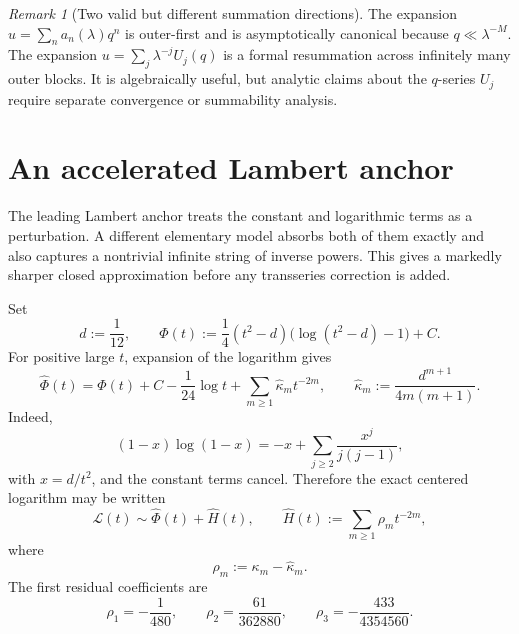 \documentclass[11pt,oneside]{article}
\theoremstyle{plain}
\theoremstyle{definition}
\theoremstyle{remark}
\newtheorem{remark}[theorem]{Remark}
\newcommand{\Lcal}{\mathcal{L}}
\begin{document}
\begin{remark}[Two valid but different summation directions]
The expansion \(u=\sum_n a_n(\lambda)q^n\) is outer-first and is asymptotically
canonical because \(q\ll\lambda^{-M}\).  The expansion
\(u=\sum_j\lambda^{-j}U_j(q)\) is a formal resummation across infinitely many
outer blocks.  It is algebraically useful, but analytic claims about the
\(q\)-series \(U_j\) require separate convergence or summability analysis.
\end{remark}

\section{An accelerated Lambert anchor}
\label{sec:accelerated-anchor}

The leading Lambert anchor treats the constant and logarithmic terms as a
perturbation.  A different elementary model absorbs both of them exactly and
also captures a nontrivial infinite string of inverse powers.  This gives a
markedly sharper closed approximation before any transseries correction is
added.

Set
\begin{equation}
 d:=\frac1{12},
 \qquad
 \widehat\Phi(t)
 :=\frac14(t^2-d)\bigl(\log(t^2-d)-1\bigr)+C.
 \label{eq:Phihat-def}
\end{equation}
For positive large \(t\), expansion of the logarithm gives
\begin{equation}
 \widehat\Phi(t)
 =\Phi(t)+C-\frac1{24}\log t
  +\sum_{m\ge1}\widehat\kappa_m t^{-2m},
 \qquad
 \widehat\kappa_m:=\frac{d^{m+1}}{4m(m+1)}.
 \label{eq:Phihat-expansion}
\end{equation}
Indeed,
\begin{equation}
 (1-x)\log(1-x)
 =-x+\sum_{j\ge2}\frac{x^j}{j(j-1)},
 \label{eq:one-minus-x-log}
\end{equation}
with \(x=d/t^2\), and the constant terms cancel.  Therefore the exact
centered logarithm may be written
\begin{equation}
 \Lcal(t)
 \sim \widehat\Phi(t)+\widehat H(t),
 \qquad
 \widehat H(t):=\sum_{m\ge1}\rho_m t^{-2m},
 \label{eq:accelerated-splitting}
\end{equation}
where
\begin{equation}
 \rho_m:=\kappa_m-\widehat\kappa_m.
 \label{eq:rho-def}
\end{equation}
The first residual coefficients are
\begin{equation}
 \rho_1=-\frac1{480},
 \qquad
 \rho_2=\frac{61}{362880},
 \qquad
 \rho_3=-\frac{433}{4354560}.
 \label{eq:rho-first}
\end{equation}
\end{document}
